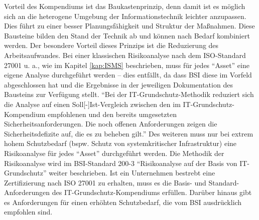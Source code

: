 Vorteil des Kompendiums ist das Baukastenprinzip, denn damit ist es möglich sich an die heterogene Umgebung der Informationstechnik leichter anzupassen. Dies führt zu einer besser Planungsfähigkeit und Struktur der Maßnahmen.\autocite[vgl.][S.2]{bundesamt_fur_sicherheit_in_der_informationstechnik_bsi_it-grundschutz-kompendium_2020} Diese Bausteine bilden den Stand der Technik ab und können nach Bedarf kombiniert werden. Der besondere Vorteil dieses Prinzips ist die Reduzierung des Arbeitsaufwandes. Bei einer klassischen Risikoanalyse nach dem ISO-Standard 27001 u. a., wie im Kapitel \vref{kap:ISMS} beschrieben, muss für jedes \enquote{Asset} eine eigene Analyse durchgeführt werden -- dies entfällt, da dass \ac{BSI} diese im Vorfeld abgeschlossen hat und die Ergebnisse in der jeweiligen Dokumentation des Bausteins zur Verfügung stellt. \enquote{Bei der IT-Grundschutz-Methodik reduziert sich die Analyse auf einen Soll[-]Ist-Vergleich zwischen den im IT-Grundschutz-Kompendium empfohlenen und den bereits umgesetzten Sicherheitsanforderungen. Die noch offenen Anforderungen zeigen die Sicherheitsdefizite auf, die es zu beheben gilt.}\autocite[][S.3]{bundesamt_fur_sicherheit_in_der_informationstechnik_bsi_it-grundschutz-kompendium_2020} Des weiteren muss nur bei extrem hohem Schutzbedarf (bspw. Schutz von systemkritischer Infrastruktur) eine Risikoanalyse für jedes \enquote{Asset} durchgeführt werden. Die Methodik der Risikoanalyse wird im BSI-Standard 200-3 \enquote{Risikoanalyse auf der Basis von IT-Grundschutz} weiter beschrieben. Ist ein Unternehmen bestrebt eine Zertifizierung nach ISO 27001 zu erhalten, muss es die Basis- und Standard-Anforderungen des IT-Grundschutz-Kompendiums erfüllen. Darüber hinaus gibt es Anforderungen für einen erhöhten Schutzbedarf, die vom \ac{BSI} ausdrücklich empfohlen sind.\autocite[vgl.][S.3]{bundesamt_fur_sicherheit_in_der_informationstechnik_bsi_it-grundschutz-kompendium_2020} 
\par
